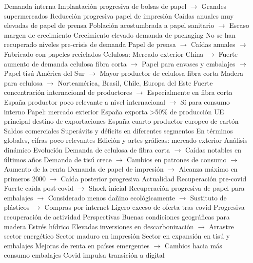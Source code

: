\documentclass{nuevotema}
\begin{document}
\begin{esquemal}
				\4 Demanda interna
				\4[] Implantación progresiva de bolsas de papel
				\4[] $\to$ Grandes supermercados
				\4[] Reducción progresiva papel de impresión
				\4[] Caídas anuales muy elevadas de papel de prensa
				\4[] Población acostumbrada a papel sanitario
				\4[] $\to$ Escaso margen de crecimiento
				\4[] Crecimiento elevado demanda de packaging
				\4[] No se han recuperado niveles pre-crisis de demanda
				\4[] Papel de prensa
				\4[] $\to$ Caídas anuales
				\4[] $\to$ Fabricado con papeles reciclados
				\4 Celulosa: Mercado exterior
				\4[] China
				\4[] $\to$ Fuerte aumento de demanda celulosa fibra corta
				\4[] $\to$ Papel para envases y embalajes
				\4[] $\to$ Papel tisú
				\4[] América del Sur
				\4[] $\to$ Mayor productor de celulosa fibra corta
				\4[] Madera para celulosa
				\4[] $\to$ Norteamérica, Brasil, Chile, Europa del Este
				\4[] Fuerte concentración internacional de productores
				\4[] $\to$ Especialmente en fibra corta
				\4[] España productor poco relevante a nivel internacional
				\4[] $\to$ Sí para consumo interno
				\4 Papel: mercado exterior
				\4[] España exporta >50\% de producción
				\4[] UE principal destino de exportaciones
				\4[] España cuarto productor europeo de cartón
				\4 Saldos comerciales
				\4[] Superávits y déficits en diferentes segmentos
				\4[] En términos globales, cifras poco relevantes
				\4 Edición y artes gráficas: mercado exterior
			\3 Análisis dinámico
				\4 Evolución
				\4[] Demanda de celulosa de fibra corta
				\4[] $\to$ Caídas notables en últimos años
				\4[] Demanda de tisú crece
				\4[] $\to$ Cambios en patrones de consumo
				\4[] $\to$ Aumento de la renta
				\4[] Demanda de papel de impresión
				\4[] $\to$ Alcanza máximo en primeros 2000
				\4[] $\to$ Caída posterior progresiva
				\4 Actualidad
				\4[] Recuperación pre-covid
				\4[] Fuerte caída post-covid
				\4[] $\to$ Shock inicial
				\4[] Recuperación progresiva de papel para embalajes
				\4[] $\to$ Considerado menos dañino ecológicamente
				\4[] $\to$ Sustituto de plásticos
				\4[] $\to$ Compras por internet
				\4[] Ligero exceso de oferta tras covid
				\4[] Progresiva recuperación de actividad
				\4 Perspectivas
				\4[] Buenas condiciones geográficas para madera
				\4[] Estrés hídrico
				\4[] Elevadas inversiones en descarbonización
				\4[] $\to$ Arrastre sector energético
				\4[] Sector maduro en impresión
				\4[] Sector en expansión en tisú y embalajes
				\4[] Mejoras de renta en países emergentes
				\4[] $\to$ Cambios hacia más consumo embalajes
				\4[] Covid impulsa transición a digital

\end{esquemal}
\end{document}
